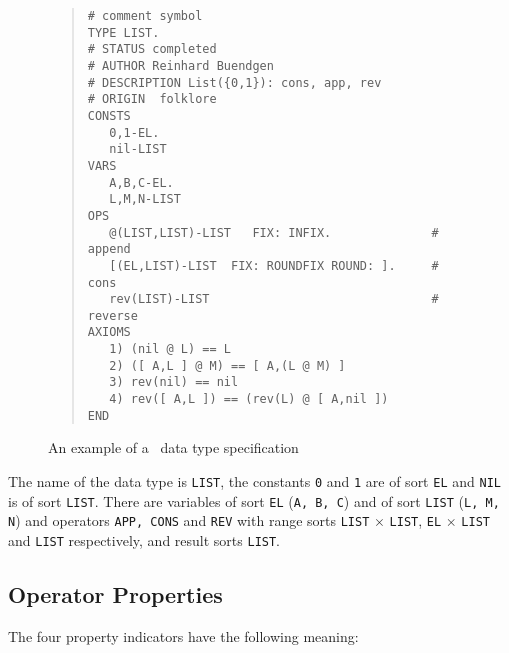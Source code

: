 \begin{figure}[htbp]
\begin{center}
\begin{minipage}{5.9in} %
\begin{quote}
\begin{verbatim}
# comment symbol
TYPE LIST. 
# STATUS completed
# AUTHOR Reinhard Buendgen
# DESCRIPTION List({0,1}): cons, app, rev
# ORIGIN  folklore
CONSTS 
   0,1-EL. 
   nil-LIST 
VARS 
   A,B,C-EL. 
   L,M,N-LIST
OPS 
   @(LIST,LIST)-LIST   FIX: INFIX.              # append 
   [(EL,LIST)-LIST  FIX: ROUNDFIX ROUND: ].     # cons
   rev(LIST)-LIST                               # reverse
AXIOMS
   1) (nil @ L) == L
   2) ([ A,L ] @ M) == [ A,(L @ M) ]
   3) rev(nil) == nil
   4) rev([ A,L ]) == (rev(L) @ [ A,nil ])
END
\end{verbatim}
\end{quote}
\end{minipage}
\end{center}
\caption{An example of a \redux\  data type specification} \label{fi:exa.old}
\end{figure}
The name of the data type is {\tt LIST}, the constants {\tt 0} and {\tt 1}
are of sort {\tt EL} and {\tt NIL} is of sort {\tt LIST}.
There are variables of sort {\tt EL} ({\tt A, B, C}) and of sort {\tt LIST}
({\tt L, M, N}) and operators {\tt APP, CONS} and {\tt REV} with range sorts 
{\tt LIST} $\times$ {\tt LIST}, {\tt EL} $\times$ {\tt LIST} and
{\tt LIST} respectively, and result sorts {\tt LIST}.

\subsection{Operator Properties}
\label{OperatorProperties}
The four property indicators have the following meaning:

